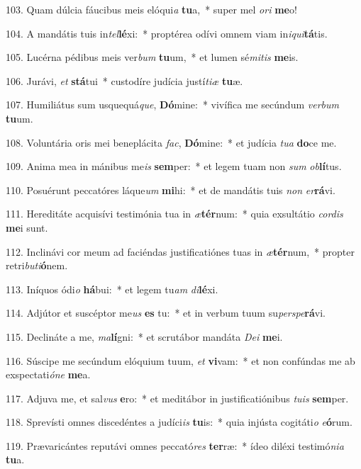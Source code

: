 103. Quam dúlcia fáucibus meis elóqui\textit{a} \textbf{tu}a,~*  super mel \textit{o}\textit{ri} \textbf{me}o!\

104. A mandátis tuis in\textit{tel}\textbf{lé}xi:~*  proptérea odívi omnem viam in\textit{i}\textit{qui}\textbf{tá}tis.\

105. Lucérna pédibus meis ver\textit{bum} \textbf{tu}um,~*  et lumen sé\textit{mi}\textit{tis} \textbf{me}is.\

106. Jurávi, \textit{et} \textbf{stá}tui~*  custodíre judícia justí\textit{ti}\textit{æ} \textbf{tu}æ.\

107. Humiliátus sum usquequá\textit{que}, \textbf{Dó}mine:~*  vivífica me secúndum \textit{ver}\textit{bum} \textbf{tu}um.\

108. Voluntária oris mei beneplácita \textit{fac}, \textbf{Dó}mine:~*  et judícia \textit{tu}\textit{a} \textbf{do}ce me.\

109. Anima mea in mánibus me\textit{is} \textbf{sem}per:~*  et legem tuam non \textit{sum} \textit{ob}\textbf{lí}tus.\

110. Posuérunt peccatóres láque\textit{um} \textbf{mi}hi:~*  et de mandátis tuis \textit{non} \textit{er}\textbf{rá}vi.\

111. Hereditáte acquisívi testimónia tua in \textit{æ}\textbf{tér}num:~*  quia exsultátio \textit{cor}\textit{dis} \textbf{me}i sunt.\

112. Inclinávi cor meum ad faciéndas justificatiónes tuas in \textit{æ}\textbf{tér}num,~*  propter retri\textit{bu}\textit{ti}\textbf{ó}nem.\

113. Iníquos ódi\textit{o} \textbf{há}bui:~*  et legem tu\textit{am} \textit{di}\textbf{lé}xi.\

114. Adjútor et suscéptor me\textit{us} \textbf{es} tu:~*  et in verbum tuum su\textit{per}\textit{spe}\textbf{rá}vi.\

115. Declináte a me, \textit{ma}\textbf{lí}gni:~*  et scrutábor mandáta \textit{De}\textit{i} \textbf{me}i.\

116. Súscipe me secúndum elóquium tuum, \textit{et} \textbf{vi}vam:~*  et non confúndas me ab exspectati\textit{ó}\textit{ne} \textbf{me}a.\

117. Adjuva me, et sal\textit{vus} \textbf{e}ro:~*  et meditábor in justificatiónibus \textit{tu}\textit{is} \textbf{sem}per.\

118. Sprevísti omnes discedéntes a judíci\textit{is} \textbf{tu}is:~*  quia injústa cogitáti\textit{o} \textit{e}\textbf{ó}rum.\

119. Prævaricántes reputávi omnes peccató\textit{res} \textbf{ter}ræ:~*  ídeo diléxi testimó\textit{ni}\textit{a} \textbf{tu}a.\

